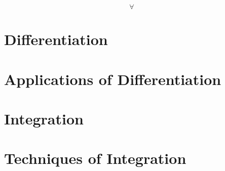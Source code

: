 \documentclass[11pt, a4paper, oneside]{memoir}
\begin{document}
\frontmatter*
{}




\clearpage

\thispagestyle{empty}
\vspace*{\fill}
\[ \forall  \]
\vfill
\clearpage

\setcounter{page}{4}

\tableofcontents*



\mainmatter*
{}

\part{Differentiation}













\part{Applications of Differentiation}
\Blinddocument







\part{Integration}
\Blinddocument

\part{Techniques of Integration}
\Blinddocument

\backmatter
\Blinddocument








\end{document}
